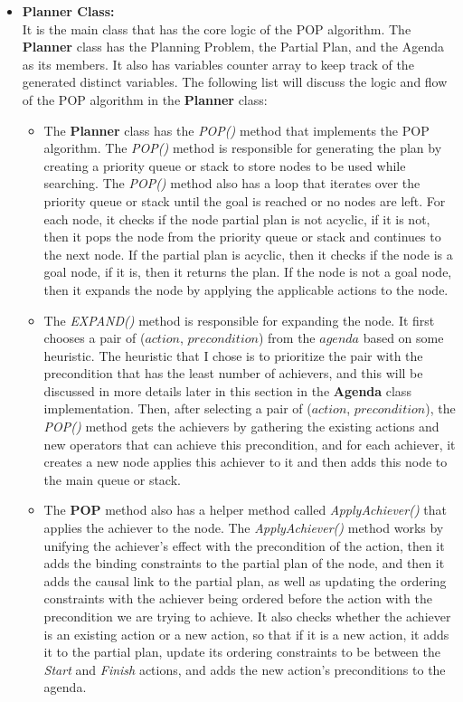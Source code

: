 \begin{itemize}
    \item \textbf{Planner Class:} \\
          It is the main class that has the core logic of the \ac{POP} algorithm. The \textbf{Planner} class has the Planning Problem, the Partial Plan, and the Agenda as its members. It also has variables counter array to keep track of the generated distinct variables. The following list will discuss the logic and flow of the \ac{POP} algorithm in the \textbf{Planner} class:
          \begin{itemize}
              \item The \textbf{Planner} class has the \textit{POP()} method that implements the \ac{POP} algorithm. The \textit{POP()} method is responsible for generating the plan by creating a priority queue or stack to store nodes to be used while searching. The \textit{POP()} method also has a loop that iterates over the priority queue or stack until the goal is reached or no nodes are left.
                    For each node, it checks if the node partial plan is not acyclic, if it is not, then it pops the node from the priority queue or stack and continues to the next node. If the partial plan is acyclic, then it checks if the node is a goal node, if it is, then it returns the plan. If the node is not a goal node, then it expands the node by applying the applicable actions to the node.

              \item The \textit{EXPAND()} method is responsible for expanding the node. It first chooses a pair of ($action$, $precondition$) from the $agenda$ based on some heuristic. The heuristic that I chose is to prioritize the pair with the precondition that has the least number of achievers, and this will be discussed in more details later in this section in the \textbf{Agenda} class implementation. Then, after selecting a pair of ($action$, $precondition$), the \textit{POP()} method gets the achievers by gathering the existing actions and new operators that can achieve this precondition, and for each achiever, it creates a new node applies this achiever to it and then adds this node to the main queue or stack.

              \item The \textbf{POP} method also has a helper method called \textit{ApplyAchiever()} that applies the achiever to the node. The \textit{ApplyAchiever()} method works by unifying the achiever's effect with the precondition of the action, then it adds the binding constraints to the partial plan of the node, and then it adds the causal link to the partial plan, as well as updating the ordering constraints with the achiever being ordered before the action with the precondition we are trying to achieve. It also checks whether the achiever is an existing action or a new action, so that if it is a new action, it adds it to the partial plan, update its ordering constraints to be between the \textit{Start} and \textit{Finish} actions, and adds the new action's preconditions to the agenda.


\end{itemize}
\end{itemize}
